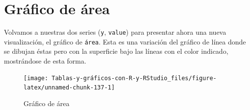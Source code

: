 \documentclass[
]{book}
\newenvironment{Shaded}{\begin{snugshade}}{\end{snugshade}}
\newcommand{\AttributeTok}[1]{\textcolor[rgb]{0.77,0.63,0.00}{#1}}
\newcommand{\ConstantTok}[1]{\textcolor[rgb]{0.00,0.00,0.00}{#1}}
\newcommand{\FunctionTok}[1]{\textcolor[rgb]{0.00,0.00,0.00}{#1}}
\newcommand{\NormalTok}[1]{#1}
\newcommand{\SpecialCharTok}[1]{\textcolor[rgb]{0.00,0.00,0.00}{#1}}
\newcommand{\StringTok}[1]{\textcolor[rgb]{0.31,0.60,0.02}{#1}}
\begin{document}
\hypertarget{gruxe1fico-de-uxe1rea}{%
\section{Gráfico de área}\label{gruxe1fico-de-uxe1rea}}

Volvamos a nuestras dos series (\texttt{y}, \texttt{value}) para presentar ahora una nueva visualización, el gráfico de \texttt{área}. Esta es una variación del gráfico de línea donde se dibujan éstas pero con la superficie bajo las líneas con el color indicado, mostrándose de esta forma.

\begin{Shaded}
\end{Shaded}

\begin{figure}[H]

{\centering \texttt{[image: Tablas-y-gráficos-con-R-y-RStudio\_files/figure-latex/unnamed-chunk-137-1]} 

}

\caption{Gráfico de área}\label{fig:unnamed-chunk-137}
\end{figure}
\end{document}
